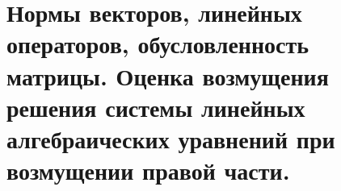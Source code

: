 \section{Нормы векторов, линейных операторов, обусловленность матрицы. Оценка возмущения решения системы линейных алгебраических уравнений при возмущении правой части.}

